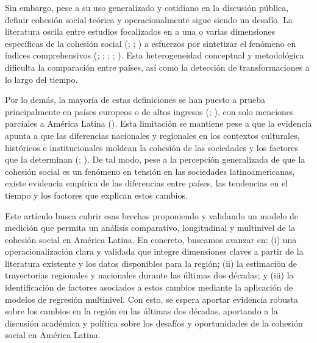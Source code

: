 \documentclass[
  letterpaper,
  DIV=11,
  numbers=noendperiod]{scrartcl}
\begin{document}
Sin embargo, pese a su uso generalizado y cotidiano en la discusión
pública, definir cohesión social teórica y operacionalmente sigue siendo
un desafío. La literatura oscila entre estudios focalizados en a una o
varias dimensiones específicas de la cohesión social
(;
; ) a esfuerzos por sintetizar el fenómeno en índices
comprehensivos (; ;
;
;
). Esta heterogeneidad
conceptual y metodológica dificulta la comparación entre países, así
como la detección de transformaciones a lo largo del tiempo.

Por lo demás, la mayoría de estas definiciones se han puesto a prueba
principalmente en países europeos o de altos ingresos
(;
), con solo
menciones parciales a América Latina
(). Esta limitación se
mantiene pese a que la evidencia apunta a que las diferencias nacionales
y regionales en los contextos culturales, históricos e institucionales
moldean la cohesión de las sociedades y los factores que la determinan
(;
). De tal
modo, pese a la percepción generalizada de que la cohesión social es un
fenómeno en tensión en las sociedades latinoamericanas, existe evidencia
empírica de las diferencias entre países, las tendencias en el tiempo y
los factores que explican estos cambios.

Este artículo busca cubrir esas brechas proponiendo y validando un
modelo de medición que permita un análisis comparativo, longitudinal y
multinivel de la cohesión social en América Latina. En concreto,
buscamos avanzar en: (i) una operacionalización clara y validada que
integre dimensiones claves a partir de la literatura existente y los
datos disponibles para la región; (ii) la estimación de trayectorias
regionales y nacionales durante las últimas dos décadas; y (iii) la
identificación de factores asociados a estos cambios mediante la
aplicación de modelos de regresión multinivel. Con esto, se espera
aportar evidencia robusta sobre los cambios en la región en las últimas
dos décadas, aportando a la discusión académica y política sobre los
desafíos y oportunidades de la cohesión social en América Latina.
\end{document}
